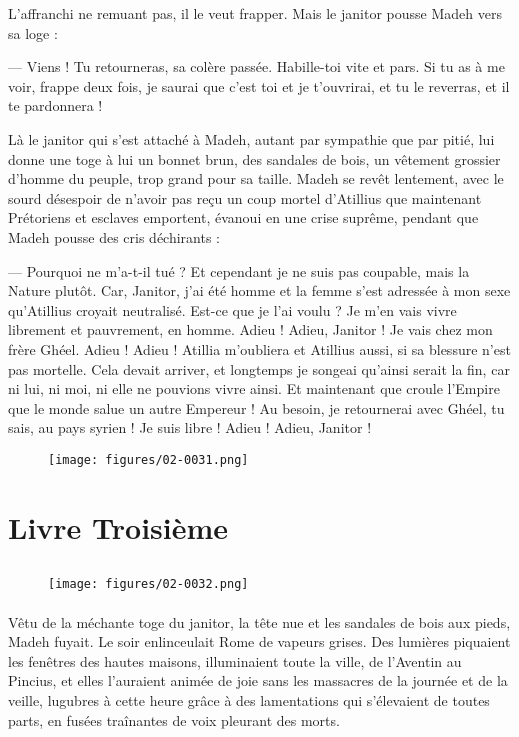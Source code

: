 \documentclass[a4paper, 11pt, oneside, polutonikogreek, french]{article}
\begin{document}
L'affranchi ne remuant pas, il le veut frapper. Mais le janitor pousse Madeh vers sa loge :

--- Viens ! Tu retourneras, sa colère passée. Habille-toi vite et pars. Si tu as à me voir, frappe deux fois, je saurai que c'est toi et je t'ouvrirai, et tu le reverras, et il te pardonnera !

Là le janitor qui s'est attaché à Madeh, autant par sympathie que par pitié, lui donne une toge à lui un bonnet brun, des sandales de bois, un vêtement grossier d'homme du peuple, trop grand pour sa taille. Madeh se revêt lentement, avec le sourd désespoir de n'avoir pas reçu un coup mortel d'Atillius que maintenant Prétoriens et esclaves emportent, évanoui en une crise suprême, pendant que Madeh pousse des cris déchirants :

--- Pourquoi ne m'a-t-il tué ? Et cependant je ne suis pas coupable, mais la Nature plutôt. Car, Janitor, j'ai été homme et la femme s'est adressée à mon sexe qu'Atillius croyait neutralisé. Est-ce que je l'ai voulu ? Je m'en vais vivre librement et pauvrement, en homme. Adieu ! Adieu, Janitor ! Je vais chez mon frère Ghéel. Adieu ! Adieu ! Atillia m'oubliera et Atillius aussi, si sa blessure n'est pas mortelle. Cela devait arriver, et longtemps je songeai qu'ainsi serait la fin, car ni lui, ni moi, ni elle ne pouvions vivre ainsi. Et maintenant que croule l'Empire que le monde salue un autre Empereur ! Au besoin, je retournerai avec Ghéel, tu sais, au pays syrien ! Je suis libre ! Adieu ! Adieu, Janitor !
\begin{figure}[H]
\centering
\texttt{[image: figures/02-0031.png]}
\end{figure}
\clearpage
\section{Livre Troisième}
\subsection{}
\begin{figure}[H]
\centering
\texttt{[image: figures/02-0032.png]}
\end{figure}
\paragraph{}
Vêtu de la méchante toge du janitor, la tête nue et les sandales de bois aux pieds, Madeh fuyait. Le soir enlinceulait Rome de vapeurs grises. Des lumières piquaient les fenêtres des hautes maisons, illuminaient toute la ville, de l'Aventin au Pincius, et elles l'auraient animée de joie sans les massacres de la journée et de la veille, lugubres à cette heure grâce à des lamentations qui s'élevaient de toutes parts, en fusées traînantes de voix pleurant des morts.
\end{document}
